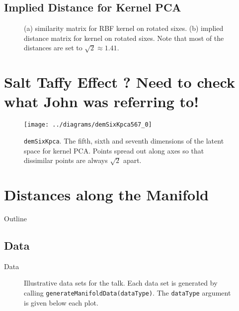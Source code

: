 \subsection{Implied Distance for Kernel PCA}

%
\begin{figure}
\begin{centering}
\hfill{}
\par\end{centering}

\caption{(a) similarity matrix for RBF kernel on rotated sixes. (b) implied
distance matrix for kernel on rotated sixes. Note that most of the
distances are set to $\sqrt{2}\approx1.41$.}

\end{figure}



\section{Salt Taffy Effect ? Need to check what John was referring to!}

%
\begin{figure}
\centering{}\texttt{[image: ../diagrams/demSixKpca567\_0]}\caption{\texttt{demSixKpca}. The fifth, sixth and seventh dimensions of the
latent space for kernel PCA. Points spread out along axes so that
dissimilar points are always $\sqrt{2}$ apart.}

\end{figure}



\section{Distances along the Manifold}

Outline  


\subsection{Data}

Data

%
\begin{figure}
 

\caption{Illustrative data sets for the talk. Each data set is generated by
calling \texttt{generateManifoldData(dataType)}. The \texttt{dataType}
argument is given below each plot.}

\end{figure}



